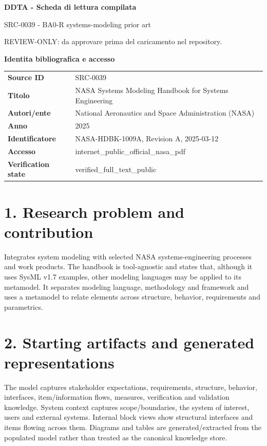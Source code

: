 \documentclass[10pt,a4paper]{article}
\newenvironment{factbox}[1]{\def\FrameCommand{\fcolorbox{ddtablue}{ddtagray}}\MakeFramed{\advance\hsize-2\width\FrameRestore}\noindent\textbf{#1}\par\smallskip}{\endMakeFramed}
\begin{document}
\begin{center}
{\LARGE\bfseries DDTA - Scheda di lettura compilata}\par
{\large SRC-0039 - BA0-R systems-modeling prior art}\par
{\small REVIEW-ONLY: da approvare prima del caricamento nel repository.}\par
\end{center}
\begin{factbox}{Identita bibliografica e accesso}
\begin{tabularx}{\linewidth}{>{\bfseries}p{3.4cm}X}
Source ID & SRC-0039\\
Titolo & NASA Systems Modeling Handbook for Systems Engineering\\
Autori/ente & National Aeronautics and Space Administration (NASA)\\
Anno & 2025\\
Identificatore & NASA-HDBK-1009A, Revision A, 2025-03-12\\
Accesso & internet\_public\_official\_nasa\_pdf\\
Verification state & verified\_full\_text\_public\\
\end{tabularx}
\end{factbox}
\section{1. Research problem and contribution}
Integrates system modeling with selected NASA systems-engineering processes and work products. The handbook is tool-agnostic and states that, although it uses SysML v1.7 examples, other modeling languages may be applied to its metamodel. It separates modeling language, methodology and framework and uses a metamodel to relate elements across structure, behavior, requirements and parametrics.
\section{2. Starting artifacts and generated representations}
The model captures stakeholder expectations, requirements, structure, behavior, interfaces, item/information flows, measures, verification and validation knowledge. System context captures scope/boundaries, the system of interest, users and external systems. Internal block views show structural interfaces and items flowing across them. Diagrams and tables are generated/extracted from the populated model rather than treated as the canonical knowledge store.
\end{document}
